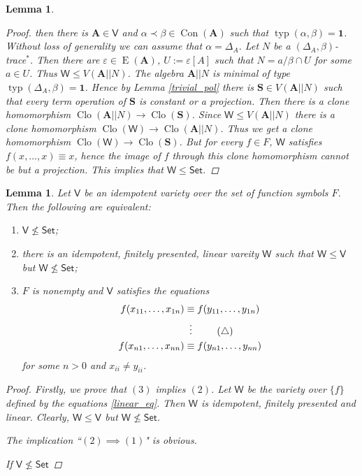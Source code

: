 \documentclass{amsart}
\theoremstyle{plain}
\newtheorem{lemma}[theorem]{Lemma}
\theoremstyle{definition}
\theoremstyle{remark}
\def\epsilon{\varepsilon}
\DeclareMathOperator{\Clo}{Clo}
\DeclareMathOperator{\Con}{Con}
\DeclareMathOperator{\typ}{typ}
\DeclareMathOperator{\Id}{E}
\begin{document}
\begin{lemma}
\begin{proof}
        then there is $\mathbf{A} \in \mathsf{V}$ and $\alpha \prec \beta \in \Con(\mathbf{A})$ such that $\typ(\alpha, \beta) =\mathbf{1}$. 
        Without loss of generality we can assume that $\alpha = \Delta_A$. 
        Let $N$ be a $(\Delta_A, \beta)$-trace$^{*}$.
        Then there are $\epsilon \in \Id(\mathbf{A})$, $U:=\epsilon[A]$ such that $N = a /\beta \cap U$ for some $a \in U$. 
        Thus $\mathsf{W} \le V(\mathbf{A}||N)$. 
        The algebra $\mathbf{A}||N$ is minimal of type $\typ(\Delta_A,\beta)=\mathbf{1}$. 
        Hence by Lemma \ref{trivial_pol}
        there is $\mathbf{S} \in V(\mathbf{A}||N)$ such that every term operation of $\mathbf{S}$ is constant or a projection. 
        Then there is a clone homomorphism $\Clo(\mathbf{A}||N) \to \Clo(\mathbf{S})$.
        Since $\mathsf{W} \le V(\mathbf{A}||N)$ there is a clone homomorphism $\Clo(\mathsf{W}) \to \Clo(\mathbf{A}||N)$. 
        Thus we get a clone homomorphism $\Clo(\mathsf{W}) \to \Clo(\mathbf{S})$. 
        But for every $f \in F$, $\mathsf{W}$ satisfies $f(x, \ldots, x) \equiv x$, hence the image of $f$ through this clone homomorphism cannot be but a projection. 
        This implies that $\mathsf{W} \le \mathsf{Set}$. 
    \end{proof}
\end{lemma}

\begin{lemma}
    \label{lemma_linear}
    Let $\mathsf{V}$ be an idempotent variety over the set of function symbols $F$. 
    Then the following are equivalent: 
    \begin{enumerate}
        \item $\mathsf{V} \nleq \mathsf{Set}$; 
        \item there is an idempotent, finitely presented, linear vareity $\mathsf{W}$ such that $\mathsf{W} \le \mathsf{V}$ but $\mathsf{W} \nleq \mathsf{Set}$; 
        \item $F$ is nonempty and $\mathsf{V}$ satisfies the equations 
        \begin{align}
            \label{linear_eq}
            f(x_{11}, \ldots, x_{1n}) & \equiv f(y_{11}, \ldots, y_{1n}) \notag\\
            & \vdotswithin{\equiv} \tag{$\triangle$}  \\ 
            f(x_{n1}, \ldots, x_{nn}) & \equiv f(y_{n1}, \ldots, y_{nn}) \notag
        \end{align}
        for some $n >0$ and $x_{ii} \neq y_{ii}$. 
    \end{enumerate}
    \begin{proof}
        Firstly, we prove that $(3)$ implies $(2)$. 
        Let $\mathsf{W}$ be the variety over $\{f\}$ defined by the equations \eqref{linear_eq}. 
        Then $\mathsf{W}$ is idempotent, finitely presented and linear. 
        Clearly, $\mathsf{W} \le \mathsf{V}$ but $\mathsf{W} \nleq \mathsf{Set}$. 

        The implication ``$(2) \implies (1)$" is obvious. 

        If $\mathsf{V} \nleq \mathsf{Set}$
    \end{proof}
\end{lemma}
\end{document}
